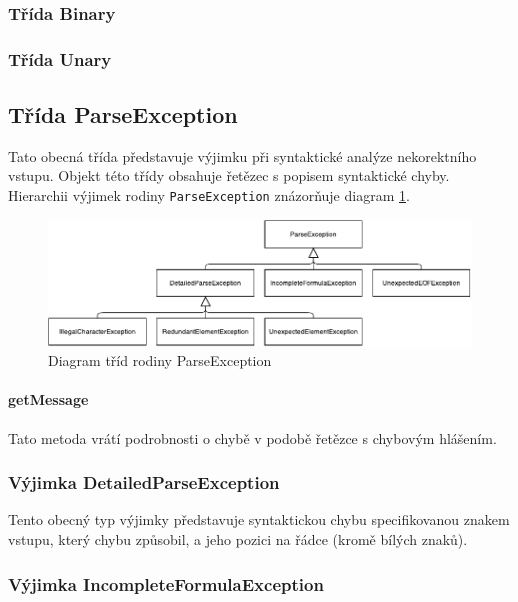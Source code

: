 \documentclass[thesis=B,czech,hidelinks]{thesis}[2012/06/26]
\begin{document}
\subsubsection{Třída Binary}

\subsubsection{Třída Unary}

\subsection{Třída ParseException}

Tato obecná třída představuje výjimku při syntaktické analýze nekorektního vstupu. Objekt této třídy obsahuje řetězec s popisem syntaktické chyby. Hierarchii výjimek rodiny \texttt{ParseException} znázorňuje diagram \ref{fig:parse_exception}.

\begin{figure}
\centering
\caption{Diagram tříd rodiny ParseException}
\label{fig:parse_exception}
\includegraphics[width=\linewidth]{diagrams/parse_exception}
\end{figure}

\paragraph{getMessage}

Tato metoda vrátí podrobnosti o chybě v podobě řetězce s chybovým hlášením.

\subsubsection{Výjimka DetailedParseException}

Tento obecný typ výjimky představuje syntaktickou chybu specifikovanou znakem vstupu, který chybu způsobil, a jeho pozici na řádce (kromě bílých znaků).

\subsubsection{Výjimka IncompleteFormulaException}
\end{document}
